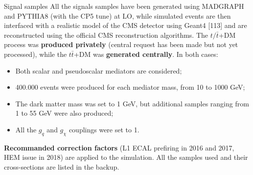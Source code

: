 \documentclass[8pt]{beamer}
\begin{document}
\begin{frame}{Signal samples}
\justifying
All the signals samples have been generated using MADGRAPH and PYTHIA8 (with the CP5 tune) at LO, while simulated events are then interfaced with a realistic model of the CMS detector using Geant4 [113] and are reconstructed using the official CMS reconstruction algorithms. \vfill
The $t/\bar t$+DM process was \textbf{produced privately} (central request has been made but not yet processed), while the $t \bar t$+DM was \textbf{generated centrally}. In both cases:

\begin{itemize}
\item Both scalar and pseudoscalar mediators are considered;
\item 400.000 events were produced for each mediator mass, from 10 to 1000 GeV;
\item The dark matter mass was set to 1 GeV, but additional samples ranging from 1 to 55 GeV were also produced;
\item All the $g_q$ and $g_\chi$ couplings were set to 1.
\end{itemize} \vfill

\textbf{Recommanded correction factors} (L1 ECAL prefiring in 2016 and 2017, HEM issue in 2018) are applied to the simulation. \vfill 
All the samples used and their cross-sections are listed in the backup. \vfill
\end{frame}
\end{document}
